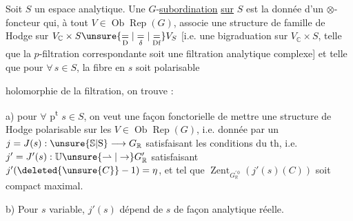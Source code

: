 
Soit $S$ un espace analytique. Une $G$-\uline{subordination}  \uline{sur} $S$ est la donnée d'un $\otimes$-foncteur qui, à tout $V\in\operatorname{Ob}\operatorname{Rep}(G)$, associe une structure de famille de Hodge  sur $V_{\mathbb{C}}\times S\unsure{\underset{\mathrm{D}}{=}|\underset{\delta}{=}|\underset{\mathrm{Df}}{=}}V_S$  [i.e. une bigraduation  sur $V_{\mathbb{C}}\times S$,  telle que la $p$-filtration correspondante soit une filtration analytique complexe] et telle que   pour  $\forall\,s\in S$, la fibre en $s$ soit polarisable 

 holomorphie de la filtration, on trouve :

a) pour $\forall$ p\textsuperscript{t} $s\in S$, on veut une façon  fonctorielle de mettre une structure de Hodge  polarisable sur les $V\in\operatorname{Ob}\operatorname{Rep}(G)$, i.e. donnée par un $j=J(s):\unsure{\mathbb{S}|\mathrm{S}}\longrightarrow G_{\mathbb{R}}$ satisfaisant les conditions du th, i.e. $j'=J'(s):\mathbb{U}\unsure{\rightharpoonup|\to}G'_{\mathbb{R}}$ satisfaisant $j'(\deleted{\unsure{C}}-1)=\eta$, et tel que $\operatorname{Zent}_{G_{\mathbb{R}}^{\prime\,0}}(j'(s)(C))$ soit compact maximal.

b) Pour $s$ variable, $j'(s)$ dépend de $s$ de façon analytique réelle.

